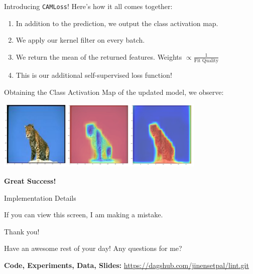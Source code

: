 \documentclass{beamer}
\begin{document}
\begin{frame}{Introducing \texttt{CAMLoss}!}
	Here's how it all comes together: 
	\begin{enumerate}[label=\alph*.]
		\item In addition to the prediction, we output the class activation map. \pause
		\item We apply our kernel filter on every batch. \pause
		\item We return the mean of the returned features. Weights $\propto \frac{1}{\text{Fit Quality}}$ \pause
		\item This is our additional self-supervised loss function! \pause
	\end{enumerate}
	Obtaining the Class Activation Map of the updated model, we observe:
	\begin{center}
		\vspace{-.9em}
		\includegraphics[width=10cm]{img/fixed-cam}
	\end{center} \pause
	\vspace{-1em}
	\textbf{Great Success!}
\end{frame}

\begin{frame}{Implementation Details}
	\begin{center}
                If you can view this screen, I am making a mistake.
        \end{center}
\end{frame}

\begin{frame}{Thank you!}
	\begin{center}
		Have an awesome rest of your day! Any questions for me?
	\end{center}
	\begin{center}
		\textbf{Code, Experiments, Data, Slides:} \url{https://dagshub.com/jinensetpal/lint.git}
	\end{center}
\end{frame}
\end{document}
